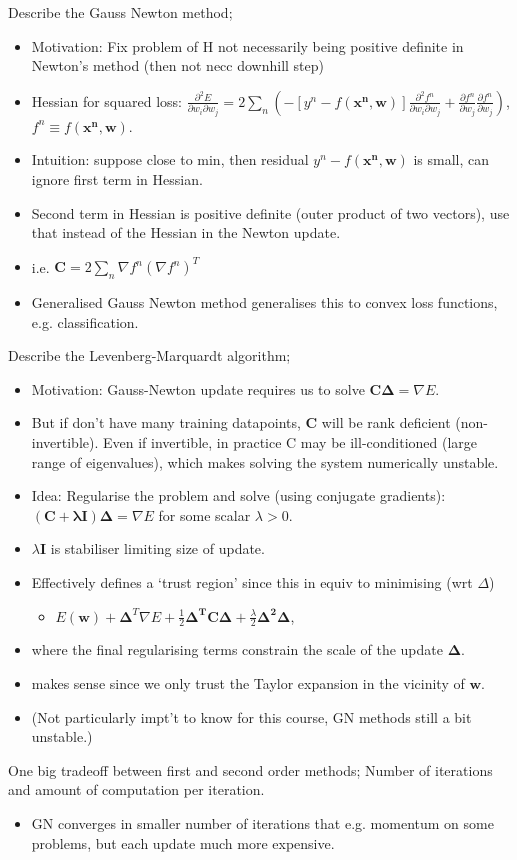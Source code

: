\documentclass{article}
\begin{document}
Describe the Gauss Newton method; \begin{itemize}
	\item Motivation: Fix problem of H not necessarily being positive definite in Newton's method (then not necc downhill step)
	\item Hessian for squared loss: $\frac{\partial^2 E}{\partial w_i \partial w_j}=2\sum_n (-[y^n-f(\mathbf{x^n, w})]\frac{\partial ^2 f^n}{\partial w_i \partial w_j}+\frac{\partial f^n}{\partial w_j}\frac{\partial f^n}{\partial w_j})$, $f^n\equiv f(\mathbf{x^n, w})$.
	\item Intuition: suppose close to min, then residual $y^n-f(\mathbf{x^n,w})$ is small, can ignore first term in Hessian. 
	\item Second term in Hessian is positive definite (outer product of two vectors), use that instead of the Hessian in the Newton update.
	\item i.e. $\mathbf{C}=2\sum_n\nabla f^n(\nabla f^n)^T$
	\item Generalised Gauss Newton method generalises this to convex loss functions, e.g. classification.
\end{itemize}

Describe the Levenberg-Marquardt algorithm; \begin{itemize}
	\item Motivation: Gauss-Newton update requires us to solve $\mathbf{C\Delta} = \nabla E$. 
	\item But if don't have many training datapoints, $\mathbf{C}$ will be rank deficient (non-invertible). Even if invertible, in practice C may be ill-conditioned (large range of eigenvalues), which makes solving the system numerically unstable.
	\item Idea: Regularise the problem and solve (using conjugate gradients): $(\mathbf{C+\lambda I})\mathbf{\Delta}=\nabla E$ for some scalar $\lambda > 0$.
	\item $\lambda \mathbf{I}$ is stabiliser limiting size of update.
	\item Effectively defines a `trust region' since this in equiv to minimising (wrt $\Delta$) \begin{itemize}
		\item $E(\mathbf{w}) + \mathbf{\Delta}^T\nabla E + \frac{1}{2}\mathbf{\Delta^TC\Delta} + \frac{\lambda}{2}\mathbf{\Delta^2\Delta}$,
	\end{itemize} \item where the final regularising terms constrain the scale of the update $\mathbf{\Delta}$.
\item makes sense since we only trust the Taylor expansion in the vicinity of $\mathbf{w}$.
\item (Not particularly impt't to know for this course, GN methods still a bit unstable.)
\end{itemize}

One big tradeoff between first and second order methods; Number of iterations and amount of computation per iteration. \begin{itemize}
	\item GN converges in smaller number of iterations that e.g. momentum on some problems, but each update much more expensive.
\end{itemize}
\end{document}
